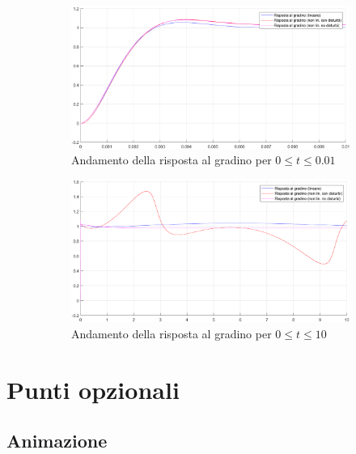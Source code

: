 \documentclass[a4paper, 11pt]{article}
\begin{document}
\begin{figure}[h!]
	\centering
	\begin{subfigure}[b]{0.45\textwidth}
		\centering
		\includegraphics[width=\textwidth]{./images/confronto.png}
		\caption{Andamento della risposta al gradino per $0\leq t\leq 0.01$}
		\label{fig:confronto}
	\end{subfigure}
	\begin{subfigure}[b]{0.45\textwidth}
		\centering
		\includegraphics[width=\textwidth]{./images/confrontoReg.png}
		\caption{Andamento della risposta al gradino per $0\leq t\leq 10$}
		\label{fig:confrontoReg}
	\end{subfigure}
	
	\caption{}
	\label{fig:confronti}
\end{figure}

\section{Punti opzionali}

\subsection{Animazione}
\end{document}
